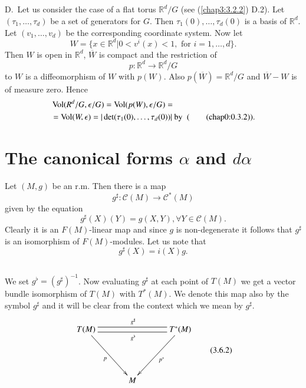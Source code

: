 \subsection{}\label{chap3:3.5.7}
D.~Let us consider the case of a flat torus $\mathbb{R}^{d}/G$ (see
(\ref{chap3:3.2.2}) D.2). Let $(\tau_{1},\ldots,\tau_{d})$ be a set of
generators for $G$. Then $\tau_{1}(0),\ldots,\tau_{d}(0)$ is a basis
of $\mathbb{R}^{d}$. Let $(v_{1},\ldots,v_{d})$ be the corresponding
coordinate system. Now let
$$
W=\{x\in\mathbb{R}^{d}|0<v^{i}(x)<1,\text{ \ for \ } i=1,\ldots,d\}.
$$
Then $W$ is open in $\mathbb{R}^{d}$, $\overline{W}$ is compact and
the restriction of 
$$
p:\mathbb{R}^{d}\to \mathbb{R}^{d}/G
$$
to $W$ is a diffeomorphism of $W$ with $p(W)$. Also
$p(\overline{W})=\mathbb{R}^{d}/G$ and $\overline{W}-W$ is of measure
zero. Hence
\begin{align*}
&\operatorname{Vol}(R^{d}/G,\epsilon/G)=\operatorname{Vol}(p(W),\epsilon/G)=\\
&=\operatorname{Vol}(W,\epsilon)=|\det(\tau_{1}(0),\ldots,\tau_{d}(0))|\text{ by }\;
    (\tag{chap0:0.3.2}).
\end{align*}

\section{The canonical forms $\alpha$ and $d\alpha$}\label{chap3:sec6}

Let $(M,g)$ be an r.m. Then there is a map
$$
g^{\sharp}:\mathscr{C}(M)\to \mathscr{C}^{\ast}(M)
$$
given \pageoriginale by the equation
$$
g^{\sharp}(X)(Y)=g(X,Y),\forall Y\in \mathscr{C}(M).
$$
Clearly it is an $F(M)$-linear map and since $g$ is non-degenerate it
follows that $g^{\sharp}$ is an isomorphism of $F(M)$-modules. Let us
note that
$$
g^{\sharp}(X)=i(X)g.
$$

\subsection{}\label{chap3:3.6.1}
We set $g^{\flat}=(g^{\sharp})^{-1}$. Now evaluating $g^{\sharp}$ at
each point of $T(M)$ we get a vector bundle isomorphism of $T(M)$ with
$T^{\ast}(M)$. We denote this map also by the symbol $g^{\sharp}$ and
it will be clear from the context which we mean by $g^{\sharp}$.
\begin{equation*}
\vcenter{\xymatrix@R=1.7cm@C=1.2cm{
T(M)\ar@{-}@<-.3em>[rr]_{g^{\flat}}\ar@{-}@<.3em>[rr]^{g^{\sharp}}\ar[dr]_{p} & & 
T^{\ast}(M)\ar[dl]^{p^{\ast}}\\
 & M & 
}}\tag{3.6.2}\label{chap3:3.6.2}
\end{equation*}

